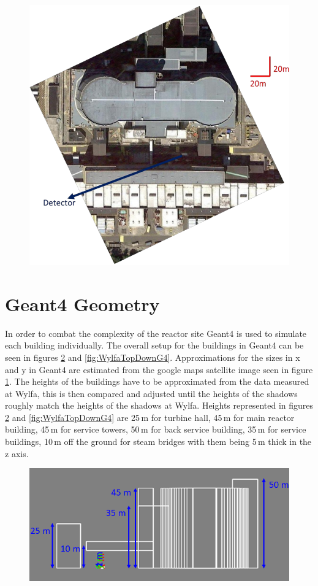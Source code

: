 \documentclass[12pt,a4paper]{article}
\begin{document}
\begin{figure}[H]
 \centering
 \includegraphics[width=0.7\linewidth]{wylfaReactorBuildings/wylfaTraceStep0.png}
 \label{fig:googleMapsDetector}
\end{figure}

\section{Geant4 Geometry} \label{sec:geant4Geometry}
In order to combat the complexity of the reactor site Geant4 \cite{Agostinelli:2002hh} is used to simulate each building individually. The overall setup for the buildings in Geant4 can be seen in figures \ref{fig:WylfaSideOnG4} and \ref{fig:WylfaTopDownG4}. Approximations for the sizes in x and y in Geant4 are estimated from the google maps satellite image seen in figure \ref{fig:googleMapsDetector}. The heights of the buildings have to be approximated from the data measured at Wylfa, this is then compared and adjusted until the heights of the shadows roughly match the heights of the shadows at Wylfa. Heights represented in figures \ref{fig:WylfaSideOnG4} and \ref{fig:WylfaTopDownG4} are 25\,m for turbine hall, 45\,m for main reactor building, 45\,m for service towers, 50\,m for back service building, 35\,m for service buildings, 10\,m off the ground for steam bridges with them being 5\,m thick in the z axis. 

\begin{figure}[H]
 \centering
 \includegraphics[width=0.6\linewidth]{wylfaReactorBuildings/WylfaG4GeometryHeight.png}
  \label{fig:WylfaSideOnG4}
\end{figure}
\end{document}
